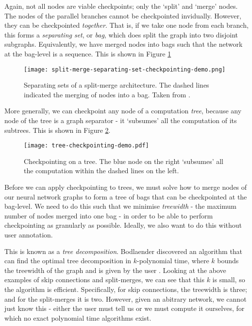 Again, not all nodes are viable checkpoints; only the `split' and `merge' nodes.
The nodes of the parallel branches cannot be checkpointed invidually.
However, they can be checkpointed \textit{together}.
That is, if we take one node from each branch, this forms a \textit{separating set}, or \textit{bag}, which does split the graph into two disjoint subgraphs.
Equivalently, we have merged nodes into bags such that the network at the bag-level is a sequence.
This is shown in Figure \ref{fig:5-split-merge-separating-set}

\begin{figure}[h]
    \centering
    \texttt{[image: split-merge-separating-set-checkpointing-demo.png]}
    \caption{Separating sets of a split-merge architecture. The dashed lines indicated the merging of nodes into a bag. Taken from \cite{Bulatov-checkpointing-article}.}
    \label{fig:5-split-merge-separating-set}
\end{figure}

More generally, we can checkpoint any node of a computation \textit{tree}, because any node of the tree is a graph separator - it `subsumes' all the computation of its subtrees.
This is shown in Figure \ref{fig:5-tree-checkpointing}.

\begin{figure}[h]
    \centering
    \texttt{[image: tree-checkpointing-demo.pdf]}
    \caption{Checkpointing on a tree. The blue node on the right `subsumes' all the computation within the dashed lines on the left.}
    \label{fig:5-tree-checkpointing}
\end{figure}

Before we can apply checkpointing to trees, we must solve how to merge nodes of our neural network graphs to form a tree of bags that can be checkpointed at the bag-level.
We need to do this such that we minimise \textit{treewidth} - the maximum number of nodes merged into one bag - in order to be able to perform checkpointing as granularly as possible.
Ideally, we also want to do this without user annotation.

This is known as a \textit{tree decomposition}.
Bodlaender discovered an algorithm that can find the optimal tree decomposition in \(k\)-polynomial time, where \(k\) bounds the treewidth of the graph and is given by the user \cite{Bodlaender2005}.
Looking at the above examples of skip connections and split-merges, we can see that this \(k\) is small, so the algorithm is efficient.
Specifically, for skip connections, the treewidth is three; and for the split-merges it is two.
However, given an abitrary network, we cannot just know this - either the user must tell us or we must compute it ourselves, for which no exact polynomial time algorithms exist.

